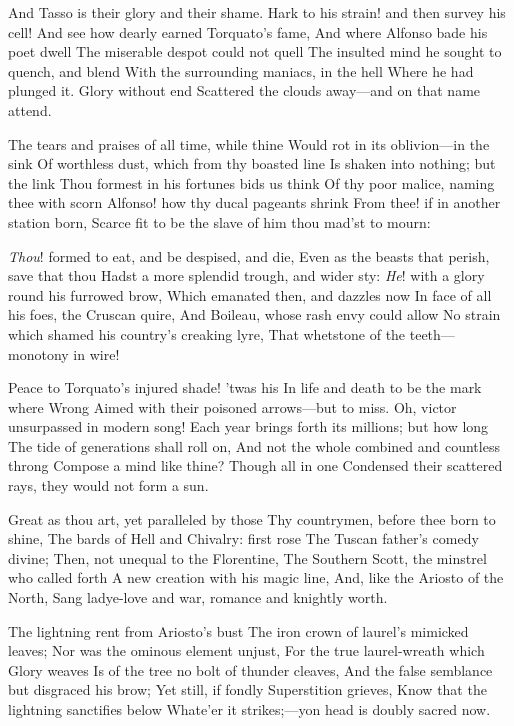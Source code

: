 \documentclass[10pt,twocolumn]{book}
\begin{document}
   And Tasso is their glory and their shame.
   Hark to his strain! and then survey his cell!
   And see how dearly earned Torquato's fame,
   And where Alfonso bade his poet dwell
   The miserable despot could not quell
   The insulted mind he sought to quench, and blend
   With the surrounding maniacs, in the hell
   Where he had plunged it.  Glory without end
Scattered the clouds away---and on that name attend.


   The tears and praises of all time, while thine
   Would rot in its oblivion---in the sink
   Of worthless dust, which from thy boasted line
   Is shaken into nothing; but the link
   Thou formest in his fortunes bids us think
   Of thy poor malice, naming thee with scorn\textemdash
   Alfonso! how thy ducal pageants shrink
   From thee! if in another station born,
Scarce fit to be the slave of him thou mad'st to mourn:


   \textit{Thou}! formed to eat, and be despised, and die,
   Even as the beasts that perish, save that thou
   Hadst a more splendid trough, and wider sty:
   \textit{He}! with a glory round his furrowed brow,
   Which emanated then, and dazzles now
   In face of all his foes, the Cruscan quire,
   And Boileau, whose rash envy could allow
   No strain which shamed his country's creaking lyre,
That whetstone of the teeth---monotony in wire!


   Peace to Torquato's injured shade! 'twas his
   In life and death to be the mark where Wrong
   Aimed with their poisoned arrows---but to miss.
   Oh, victor unsurpassed in modern song!
   Each year brings forth its millions; but how long
   The tide of generations shall roll on,
   And not the whole combined and countless throng
   Compose a mind like thine?  Though all in one
Condensed their scattered rays, they would not form a sun.


   Great as thou art, yet paralleled by those
   Thy countrymen, before thee born to shine,
   The bards of Hell and Chivalry:  first rose
   The Tuscan father's comedy divine;
   Then, not unequal to the Florentine,
   The Southern Scott, the minstrel who called forth
   A new creation with his magic line,
   And, like the Ariosto of the North,
Sang ladye-love and war, romance and knightly worth.


   The lightning rent from Ariosto's bust
   The iron crown of laurel's mimicked leaves;
   Nor was the ominous element unjust,
   For the true laurel-wreath which Glory weaves
   Is of the tree no bolt of thunder cleaves,
   And the false semblance but disgraced his brow;
   Yet still, if fondly Superstition grieves,
   Know that the lightning sanctifies below
Whate'er it strikes;---yon head is doubly sacred now.
\end{document}
